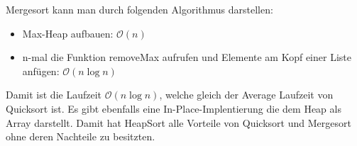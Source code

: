 Mergesort kann man durch folgenden Algorithmus darstellen:
\begin{itemize}
	\item Max-Heap aufbauen: \(\mathcal{O}(n)\)
	\item n-mal die Funktion removeMax aufrufen und Elemente am Kopf einer Liste anfügen: \(\mathcal{O}(n \log n)\)
\end{itemize}
Damit ist die Laufzeit \(\mathcal{O}(n \log n)\), welche gleich der Average Laufzeit von Quicksort ist.
Es gibt ebenfalls eine In-Place-Implentierung die dem Heap als Array darstellt.
Damit hat HeapSort alle Vorteile von Quicksort und Mergesort ohne deren Nachteile zu besitzten.